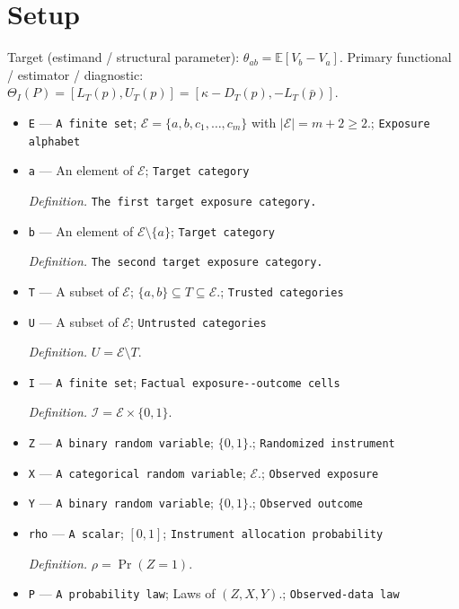 \documentclass{article}
\begin{document}
\section{Setup}

Target (estimand / structural parameter): \(\theta_{ab}=\mathbb E[V_b-V_a]\).
Primary functional / estimator / diagnostic: \(\Theta_I(P)=[L_T(p),U_T(p)]=[\kappa-D_T(p),-L_T(\bar p)]\).
\begin{itemize}
  \item \texttt{E} --- \texttt{A finite set}; \(\mathcal E=\{a,b,c_1,\ldots,c_m\}\) with \(|\mathcal E|=m+2\geq 2\).; \texttt{Exposure alphabet}
  \item \texttt{a} --- An element of \(\mathcal E\); \texttt{Target category}
  \par\smallskip\noindent\emph{Definition.} \texttt{The first target exposure category.}
  \item \texttt{b} --- An element of \(\mathcal E\setminus\{a\}\); \texttt{Target category}
  \par\smallskip\noindent\emph{Definition.} \texttt{The second target exposure category.}
  \item \texttt{T} --- A subset of \(\mathcal E\); \(\{a,b\}\subseteq T\subseteq\mathcal E\).; \texttt{Trusted categories}
  \item \texttt{U} --- A subset of \(\mathcal E\); \texttt{Untrusted categories}
  \par\smallskip\noindent\emph{Definition.} \(U=\mathcal E\setminus T\).
  \item \texttt{I} --- \texttt{A finite set}; \texttt{Factual exposure-\allowbreak{}-\allowbreak{}outcome cells}
  \par\smallskip\noindent\emph{Definition.} \(\mathcal I=\mathcal E\times\{0,1\}\).
  \item \texttt{Z} --- \texttt{A binary random variable}; \(\{0,1\}\).; \texttt{Randomized instrument}
  \item \texttt{X} --- \texttt{A categorical random variable}; \(\mathcal E\).; \texttt{Observed exposure}
  \item \texttt{Y} --- \texttt{A binary random variable}; \(\{0,1\}\).; \texttt{Observed outcome}
  \item \texttt{rho} --- \texttt{A scalar}; \([0,1]\); \texttt{Instrument allocation probability}
  \par\smallskip\noindent\emph{Definition.} \(\rho=\Pr(Z=1)\).
  \item \texttt{P} --- \texttt{A probability law}; Laws of \((Z,X,Y)\).; \texttt{Observed-\allowbreak{}data law}

\end{itemize}
\end{document}

